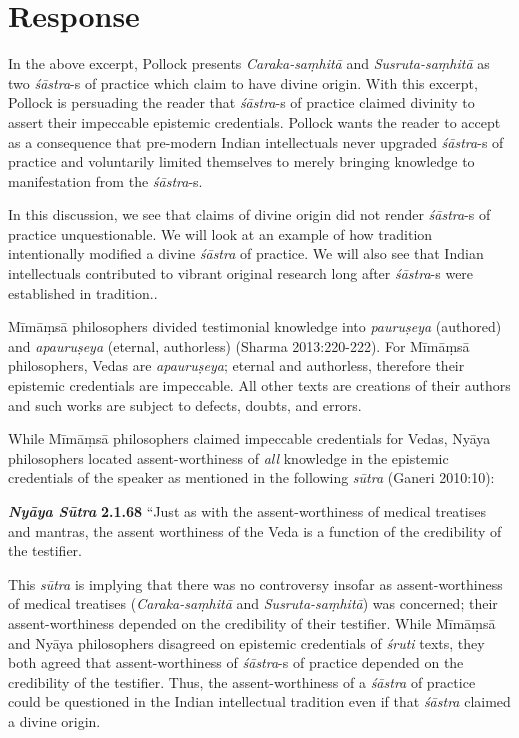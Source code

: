 \section*{Response}

In the above excerpt, Pollock presents {\sl Caraka-saṃhitā} and {\sl Susruta-saṃhitā} as two {\sl śāstra}-s of practice which claim to have divine origin.  With this excerpt, Pollock is persuading the reader that {\sl śāstra}-s of practice claimed divinity to assert their impeccable epistemic credentials. Pollock wants the reader to accept as a consequence that pre-modern Indian intellectuals never upgraded {\sl śāstra}-s of practice and voluntarily limited themselves to merely bringing knowledge to manifestation from the {\sl śāstra}-s.

In this discussion, we see that claims of divine origin did not render {\sl śāstra}-s of practice unquestionable. We will look at an example of how tradition intentionally modified a divine {\sl śāstra} of practice. We will also see that Indian intellectuals contributed to vibrant original research long after {\sl śāstra}-s were established in tradition..

\newpage

Mīmāṃsā philosophers divided testimonial knowledge into {\sl pauruṣeya} (authored) and {\sl apauruṣeya} (eternal, authorless) (Sharma 2013:220-222). For Mīmāṃsā philosophers, Vedas are {\sl apauruṣeya}; eternal and authorless, therefore their epistemic credentials are impeccable. All other texts are creations of their authors and such works are subject to defects, doubts, and errors.

While Mīmāṃsā philosophers claimed impeccable credentials for Vedas, Nyāya philosophers located assent-worthiness of {\sl all} knowledge in the epistemic credentials of the speaker as mentioned in the following {\sl sūtra} (Ganeri 2010:10):
\begin{myquote}
{{\sl\bfseries Nyāya Sūtra}\relax}  {\bf 2.1.68} ``Just as with the assent-worthiness of medical treatises and mantras, the assent worthiness of the Veda is a function of the credibility of the testifier.
\end{myquote}

This {\sl sūtra} is implying that there was no controversy insofar as assent-worthiness of medical treatises ({\sl Caraka-saṃhitā} and {\sl Susruta-saṃhitā}) was concerned; their assent-worthiness depended on the credibility of their testifier. While Mīmāṃsā and Nyāya philosophers disagreed on epistemic credentials of {\sl śruti} texts, they both agreed that assent-worthiness of {\sl śāstra}-s of practice depended on the credibility of the testifier. Thus, the assent-worthiness of a {\sl śāstra} of practice could be questioned in the Indian intellectual tradition even if that {\sl śāstra} claimed a divine origin.

